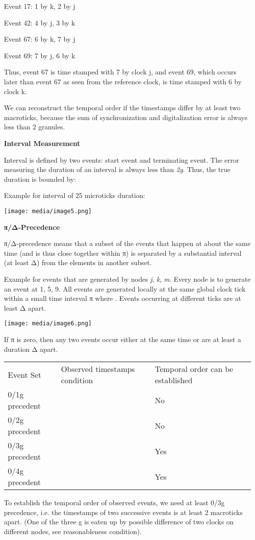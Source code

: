 Event 17: 1 by k, 2 by j

Event 42: 4 by j, 3 by k

Event 67: 6 by k, 7 by j

Event 69: 7 by j, 6 by k

Thus, event 67 is time stamped with 7 by clock j, and event 69, which
occurs later than event 67 as seen from the reference clock, is time
stamped with 6 by clock k.

We can reconstruct the temporal order if the timestamps differ by at
least two macroticks, because the sum of synchronization and
digitalization error is always less than 2 granules.

\textbf{Interval Measurement}

Interval is defined by two events: start event and terminating event.
The error measuring the duration of an interval is always less than
\emph{2g}. Thus, the true duration is bounded by:

Example for interval of 25 microticks duration:

\texttt{[image: media/image5.png]}

\textbf{π/Δ-Precedence}

π/Δ-precedence means that a subset of the events that happen at about
the same time (and is thus close together within π) is separated by a
substantial interval (at least Δ) from the elements in another subset.

Example for events that are generated by nodes \emph{j}, \emph{k},
\emph{m}. Every node is to generate an event at 1, 5, 9. All events are
generated locally at the same global clock tick within a small time
interval π where . Events occurring at different ticks are at least Δ
apart.

\texttt{[image: media/image6.png]}

If π is zero, then any two events occur either at the same time or are
at least a duration Δ apart.

\begin{longtable}[c]{@{}lll@{}}
\toprule
Event Set & Observed timestamps condition & Temporal order can be
established\tabularnewline
0/1g precedent & & No\tabularnewline
0/2g precedent & & No\tabularnewline
0/3g precedent & & Yes\tabularnewline
0/4g precedent & & Yes\tabularnewline
\bottomrule
\end{longtable}

To establish the temporal order of observed events, we need at least
0/3g precedence, i.e. the timestamps of two successive events is at
least 2 macroticks apart. (One of the three g is eaten up by possible
difference of two clocks on different nodes, see reasonableness
condition).

